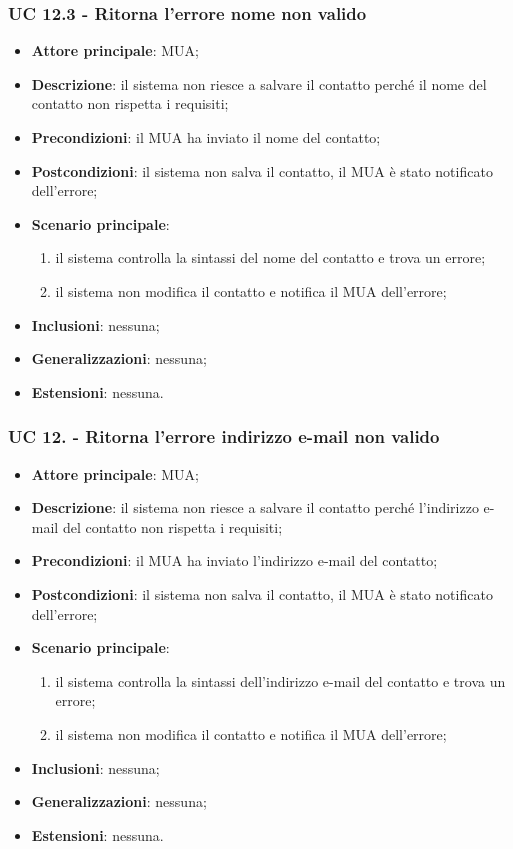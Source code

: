 \subsubsection{UC 12.3 - Ritorna l'errore nome non valido} \label{sec:UC12.3}
    \begin{itemize}
        \item \textbf{Attore principale}: MUA;
        \item \textbf{Descrizione}: il sistema non riesce a salvare il contatto perché il nome del contatto non rispetta i requisiti;
        \item \textbf{Precondizioni}: il MUA ha inviato il nome del contatto;
        \item \textbf{Postcondizioni}: il sistema non salva il contatto, il MUA è stato notificato dell'errore;
        \item \textbf{Scenario principale}:
            \begin{enumerate}
                \item il sistema controlla la sintassi del nome del contatto e trova un errore;
                \item il sistema non modifica il contatto e notifica il MUA dell'errore;
            \end{enumerate}
        \item \textbf{Inclusioni}: nessuna;
        \item \textbf{Generalizzazioni}: nessuna;
        \item \textbf{Estensioni}: nessuna.
    \end{itemize}

\subsubsection{UC 12. - Ritorna l'errore indirizzo e-mail non valido} \label{sec:UC12.4}
    \begin{itemize}
        \item \textbf{Attore principale}: MUA;
        \item \textbf{Descrizione}: il sistema non riesce a salvare il contatto perché l'indirizzo e-mail del contatto non rispetta i requisiti;
        \item \textbf{Precondizioni}: il MUA ha inviato l'indirizzo e-mail del contatto;
        \item \textbf{Postcondizioni}: il sistema non salva il contatto, il MUA è stato notificato dell'errore;
        \item \textbf{Scenario principale}:
            \begin{enumerate}
                \item il sistema controlla la sintassi dell'indirizzo e-mail del contatto e trova un errore;
                \item il sistema non modifica il contatto e notifica il MUA dell'errore;
            \end{enumerate}
        \item \textbf{Inclusioni}: nessuna;
        \item \textbf{Generalizzazioni}: nessuna;
        \item \textbf{Estensioni}: nessuna.
    \end{itemize}